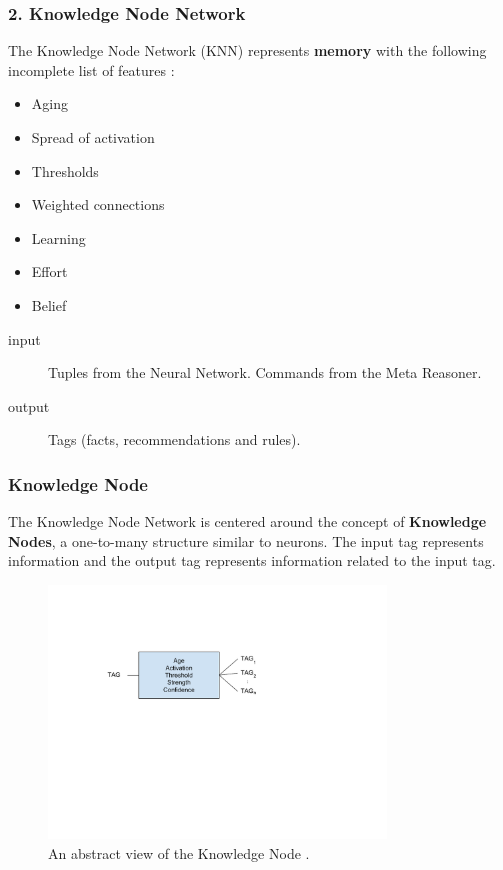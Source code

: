 \documentclass{beamer}
\begin{document}
	\begin{frame}
		\frametitle{2. Knowledge Node Network}
		The Knowledge Node Network (KNN) represents \textbf{memory} with the following incomplete list of features :
		\begin{itemize}
			\item Aging
			\item Spread of activation
			\item Thresholds
			\item Weighted connections
			\item Learning
			\item Effort
			\item Belief
		\end{itemize}
	
		\begin{description}
			\item[input] 
				Tuples from the Neural Network. \linebreak
				Commands from the Meta Reasoner.
			\item[output] Tags (facts, recommendations and rules).
		\end{description}
	
	\end{frame}

	\begin{frame}
		\frametitle{Knowledge Node}
		The Knowledge Node Network is centered around the concept of \textbf{Knowledge Nodes}, a one-to-many structure similar to neurons. The input tag represents information and the output tag represents information related to the input tag.
		\begin{figure}
			\centering
			\includegraphics[width=0.8\textwidth]{figures/kn.pdf}
			\caption
			{An abstract view of the Knowledge Node \footfullcite{vybihal-model}.}
			\label{fig:kn}
		\end{figure}
	\end{frame}
\end{document}
